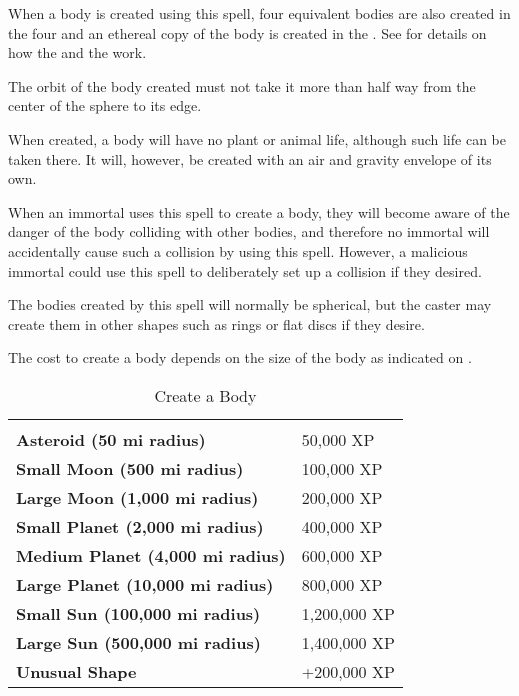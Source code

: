 \begin{multicols*}{2}
When a body is created using this spell, four equivalent bodies are also created in the four  and an ethereal copy of the body is created in the . See  for details on how the  and the  work.

The orbit of the body created must not take it more than half way from the center of the sphere to its edge.

When created, a body will have no plant or animal life, although such life can be taken there. It will, however, be created with an air and gravity envelope of its own.

When an immortal uses this spell to create a body, they will become aware of the danger of the body colliding with other bodies, and therefore no immortal will accidentally cause such a collision by using this spell. However, a malicious immortal could use this spell to deliberately set up a collision if they desired.

The bodies created by this spell will normally be spherical, but the caster may create them in other shapes such as rings or flat discs if they desire.

The cost to create a body depends on the size of the body as indicated on .

\begin {table}[H]
  \caption{Create a Body}\label{tab:Create a Body}
  \begin{tabularx}{\columnwidth}{>{\bfseries}YY}
	 & \\
	Asteroid (50 mi radius) & 50,000 XP\\
	Small Moon (500 mi radius) & 100,000 XP\\
	Large Moon (1,000 mi radius) & 200,000 XP\\
	Small Planet (2,000 mi radius) & 400,000 XP\\
	Medium Planet (4,000 mi radius) & 600,000 XP\\
	Large Planet (10,000 mi radius) & 800,000 XP\\
	Small Sun (100,000 mi radius) & 1,200,000 XP\\
	Large Sun (500,000 mi radius) & 1,400,000 XP\\
	Unusual Shape & +200,000 XP
  \end {tabularx}
\end {table}


\end{multicols*}
